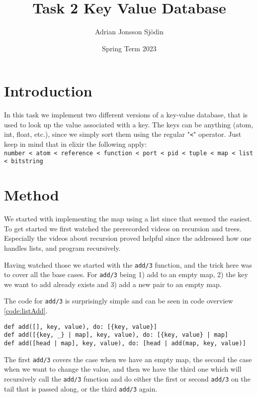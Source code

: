 \documentclass[a4paper,11pt]{article}
\newenvironment{code}{\captionsetup{type=listing}}{}
\begin{document}
\title{
    \textbf{Task 2 Key Value Database}
}
\author{Adrian Jonsson Sjödin}
\date{Spring Term 2023}

\maketitle

\section*{Introduction}
In this task we implement two different versions of a key-value database, that is used to look up the value associated with a key. The keys can be 
anything (atom, int, float, etc.), since we simply sort them using the regular "{\tt <}" operator. Just keep in mind that in elixir the following apply:\\
{\tt number < atom < reference < function < port < pid < tuple < map < list < bitstring}


\section*{Method}
We started with implementing the map using a list since that seemed the easiest. To get started we first watched the prerecorded videos on recursion 
and trees. Especially the videos about recursion proved helpful since the addressed how one handles lists, and program recursively.

Having watched those we started with the {\tt add/3} function, and the trick here was to cover all the base cases. For {\tt add/3} being 
1) add to an empty map, 2) the key we want to add already exists and 3) add a new pair to an empty map.

The code for {\tt add/3} is surprisingly simple and can be seen in code overview \ref{code:listAdd}. 

\begin{code}
\label{code:listAdd}
\begin{verbatim}
def add([], key, value), do: [{key, value}]
def add([{key, _} | map], key, value), do: [{key, value} | map]
def add([head | map], key, value), do: [head | add(map, key, value)]
\end{verbatim}
\end{code}
The first {\tt add/3} covers the case when we have an empty map, the second the case when we want to change the value, and then we have the third
one which will recursively call the {\tt add/3} function and do either the first or second {\tt add/3} on the tail that is passed along, or the third
{\tt add/3} again.
\end{document}
